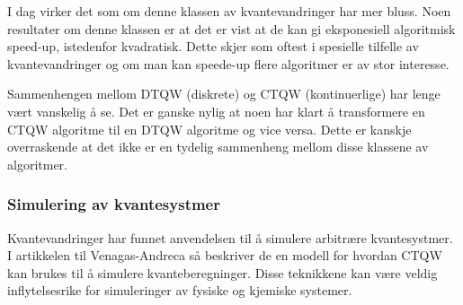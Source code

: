         I dag virker det som om denne klassen av kvantevandringer har mer bluss. Noen resultater om denne klassen er at det er vist at de kan gi eksponesiell algoritmisk speed-up, istedenfor kvadratisk. Dette skjer som oftest i spesielle tilfelle av kvantevandringer og om man kan speede-up flere algoritmer er av stor interesse.
        
        Sammenhengen mellom DTQW (diskrete) og CTQW (kontinuerlige) har lenge vært vanskelig å se. Det er ganske nylig at noen har klart å transformere en CTQW algoritme til en DTQW algoritme og vice versa. Dette er kanskje overraskende at det ikke er en tydelig sammenheng mellom disse klassene av algoritmer.
        
    \subsubsection*{Simulering av kvantesystmer}
    
        Kvantevandringer har funnet anvendelsen til å simulere arbitrære kvantesystmer. I artikkelen til Venagas-Andreca \cite{Venegas_Andraca_2012} så beskriver de en modell for hvordan CTQW kan brukes til å simulere kvanteberegninger. Disse teknikkene kan være veldig inflytelsesrike for simuleringer av fysiske og kjemiske systemer.